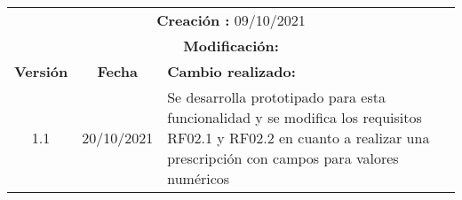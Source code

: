\begin{center}
\begin{tabular}{|c|c|p{4cm}|p{4cm}|}
            \multicolumn{4}{|p{12cm}|}{\textbf{Creación : }09/10/2021}  \\
            \multicolumn{4}{|p{12cm}|}{\textbf{Modificación: }}  \\
             \textbf{Versión} & \textbf{Fecha} & \multicolumn{2}{p{8cm}|}{\textbf{Cambio realizado:}} \\
            \hline
               1.1    &20/10/2021 &   \multicolumn{2}{p{8cm}|}{Se desarrolla prototipado para esta funcionalidad y se modifica los requisitos RF02.1 y RF02.2 en cuanto a realizar una prescripción con campos para valores numéricos}
              \\
            \hline
        \end{tabular}

        
        
        
        
        
        
        
        

\end{center}
